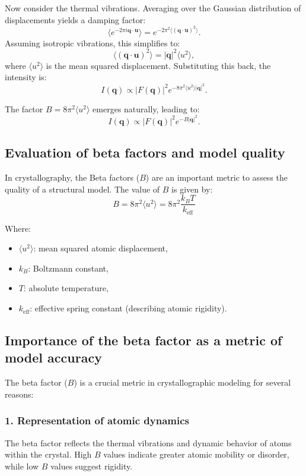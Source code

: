 \documentclass[English, Lau, oneside]{sapthesis}
\begin{document}
Now consider the thermal vibrations. Averaging over the Gaussian distribution of displacements yields a damping factor:
\[
\langle e^{-2\pi i \mathbf{q} \cdot \mathbf{u}} \rangle = e^{-2\pi^2 \langle (\mathbf{q} \cdot \mathbf{u})^2 \rangle}.
\]
Assuming isotropic vibrations, this simplifies to:
\[
\langle (\mathbf{q} \cdot \mathbf{u})^2 \rangle = |\mathbf{q}|^2 \langle u^2 \rangle,
\]
where $\langle u^2 \rangle$ is the mean squared displacement. Substituting this back, the intensity is:
\[
I(\mathbf{q}) \propto |F(\mathbf{q})|^2 e^{-8\pi^2 \langle u^2 \rangle |\mathbf{q}|^2}.
\]

The factor $B = 8\pi^2 \langle u^2 \rangle$ emerges naturally, leading to:
\[
I(\mathbf{q}) \propto |F(\mathbf{q})|^2 e^{-B |\mathbf{q}|^2}.
\]

\subsection*{Evaluation of beta factors and model quality}
\noindent In crystallography, the Beta factors (\(B\)) are an important metric to assess the quality of a structural model. The value of \(B\) is given by:
\begin{equation}
    B = 8\pi^2 \langle u^2 \rangle = 8\pi^2 \frac{k_B T}{k_{\text{eff}}} \label{Kirchhoff}
\end{equation}

Where:
\begin{itemize}
    \item \(\langle u^2 \rangle\): mean squared atomic displacement,
    \item \(k_B\): Boltzmann constant,
    \item \(T\): absolute temperature,
    \item \(k_{\text{eff}}\): effective spring constant (describing atomic rigidity).
\end{itemize}


\subsection*{Importance of the beta factor as a metric of model accuracy}
\noindent The beta factor ($B$) is a crucial metric in crystallographic modeling for several reasons:

\subsubsection*{1. Representation of atomic dynamics}
The beta factor reflects the thermal vibrations and dynamic behavior of atoms within the crystal. High $B$ values indicate greater atomic mobility or disorder, while low $B$ values suggest rigidity.
\end{document}
